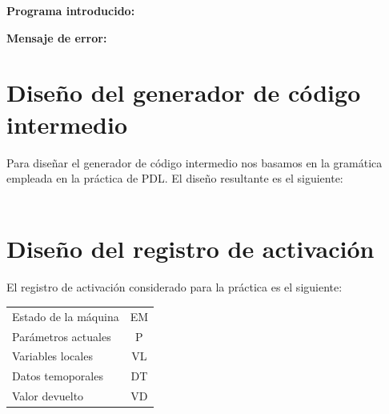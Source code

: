 \documentclass[11pt, , a4paper, titlepage]{article}
\newenvironment{changemargin}[2]{%
\begin{list}{}{%
\setlength{\topsep}{0pt}%
\setlength{\leftmargin}{#1}%
\setlength{\rightmargin}{#2}%
\setlength{\listparindent}{\parindent}%
\setlength{\itemindent}{\parindent}%
\setlength{\parsep}{\parskip}%
}%
\item[]}{\end{list}}
\begin{document}
\begin{changemargin}{+0.5cm}{+0cm}
    \vspace{1mm}

    \textbf{Programa introducido:}
    \begin{changemargin}{+0.5cm}{+0cm}
        
    \end{changemargin}

    \vspace{2mm}

    \textbf{Mensaje de error:}
    \vspace{1mm}
    \begin{changemargin}{+0.5cm}{+0cm}
    \end{changemargin}

\end{changemargin}


\clearpage

\section{Diseño del generador de código intermedio}


Para diseñar el generador de código intermedio nos basamos en la gramática empleada en la práctica de PDL.
El diseño resultante es el siguiente: \\ \\


\section{Diseño del registro de activación}
El registro de activación considerado para la práctica es el siguiente: \\
\begin{table}[H]
    \centering
    \begin{tabular}{ l c }
    Estado de la máquina & EM \\
    Parámetros actuales  & P  \\
    Variables locales    & VL \\
    Datos temoporales    & DT \\
    Valor devuelto       & VD
    \end{tabular}
\end{table}
\end{document}
